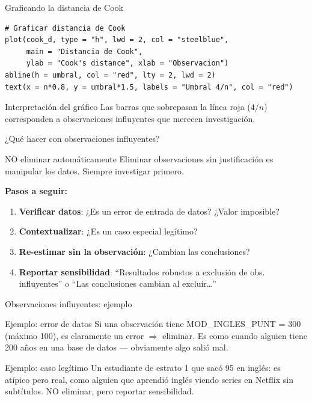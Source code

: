 \documentclass[aspectratio=169, 11pt]{beamer}
\begin{document}
\begin{frame}[fragile]{Graficando la distancia de Cook}
\begin{lstlisting}
# Graficar distancia de Cook
plot(cook_d, type = "h", lwd = 2, col = "steelblue",
     main = "Distancia de Cook",
     ylab = "Cook's distance", xlab = "Observacion")
abline(h = umbral, col = "red", lty = 2, lwd = 2)
text(x = n*0.8, y = umbral*1.5, labels = "Umbral 4/n", col = "red")
\end{lstlisting}

\vspace{0.3cm}
\begin{alertblock}{Interpretación del gráfico}
Las barras que sobrepasan la línea roja ($4/n$) corresponden a observaciones influyentes que merecen investigación.
\end{alertblock}
\end{frame}

\begin{frame}{¿Qué hacer con observaciones influyentes?}
\begin{alertblock}{NO eliminar automáticamente}
Eliminar observaciones sin justificación es manipular los datos. Siempre investigar primero.
\end{alertblock}

\textbf{Pasos a seguir:}
\begin{enumerate}
\item \textbf{Verificar datos}: ¿Es un error de entrada de datos? ¿Valor imposible?
\item \textbf{Contextualizar}: ¿Es un caso especial legítimo?
\item \textbf{Re-estimar sin la observación}: ¿Cambian las conclusiones?
\item \textbf{Reportar sensibilidad}: ``Resultados robustos a exclusión de obs. influyentes'' o ``Las conclusiones cambian al excluir\ldots''
\end{enumerate}
\end{frame}

\begin{frame}{Observaciones influyentes: ejemplo}
\begin{exampleblock}{Ejemplo: error de datos}
Si una observaci\'on tiene MOD\_INGLES\_PUNT = 300 (m\'aximo 100), es claramente un error $\Rightarrow$ eliminar. Es como cuando alguien tiene 200 a\~nos en una base de datos --- obviamente algo sali\'o mal.
\end{exampleblock}

\vspace{0.3cm}
\begin{alertblock}{Ejemplo: caso leg\'itimo}
Un estudiante de estrato 1 que sac\'o 95 en ingl\'es: es at\'ipico pero real, como alguien que aprendi\'o ingl\'es viendo series en Netflix sin subt\'itulos. NO eliminar, pero reportar sensibilidad.
\end{alertblock}
\end{frame}
\end{document}

